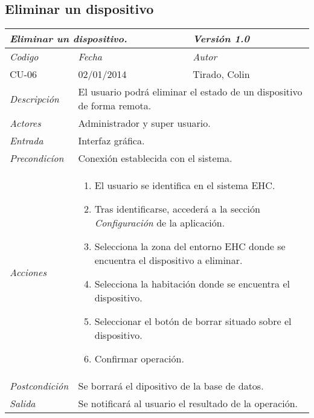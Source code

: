 \subsection{Eliminar un dispositivo}
\begin{center}
    \begin{tabular}{|p{3cm}|p{4cm}|p{4cm}|p{4cm}|}
    \hline \multicolumn{3}{|p{9cm}|}{\textit{Eliminar un dispositivo.}} & \textit{Versi\'on 1.0} \\
	\hline \textit{Codigo} & \textit{Fecha} & \multicolumn{2}{|p{6cm}|}{\textit{Autor}} \\
	CU-06 & 02/01/2014 & \multicolumn{2}{|p{6cm}|}{Tirado, Colin} \\		
    \hline \textit{Descripci\'on} & \multicolumn{3}{|p{9cm}|}{El usuario podr\'a eliminar el estado de un dispositivo de forma remota.} \\
    \hline \textit{Actores} & \multicolumn{3}{|p{9cm}|}{Administrador y super usuario.} \\
    \hline \textit{Entrada} & \multicolumn{3}{|p{9cm}|}{Interfaz gr\'afica.} \\
    \hline \textit{Precondic\'ion} & \multicolumn{3}{|p{9cm}|}{Conexi\'on establecida con el sistema.} \\
    \hline \textit{Acciones} & \multicolumn{3}{|p{9cm}|}{
        \begin{enumerate}
        \item El usuario se identifica en el sistema EHC.
        \item Tras identificarse, acceder\'a a la secci\'on \textit{Configuraci\'on} de la aplicaci\'on.
        \item Selecciona la zona del entorno EHC donde se encuentra el dispositivo a eliminar.
        \item Selecciona la habitaci\'on donde se encuentra el dispositivo.
        \item Seleccionar el bot\'on de borrar situado sobre el dispositivo.
        \item Confirmar operaci\'on.
        \end{enumerate}
           } \\
    \hline \textit{Postcondici\'on} & \multicolumn{3}{|p{9cm}|}{Se borrar\'a el dipositivo de la base de datos.} \\
    \hline \textit{Salida} & \multicolumn{3}{|p{9cm}|}{Se notificar\'a al usuario el resultado de la operaci\'on.} \\ \hline
    \end{tabular}
\end{center}